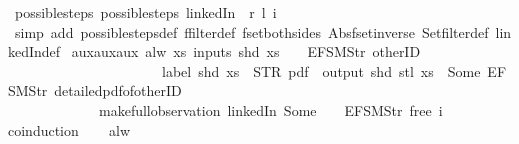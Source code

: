 \begin{isabellebody}
%
\endisadelimproof
\isanewline
{}\isamarkupfalse%
\ possible{\isacharunderscore}steps{\isacharunderscore}{}{\isacharcolon}\ {\isachardoublequoteopen}possible{\isacharunderscore}steps\ linkedIn\ {}\ r\ l\ i\ {\isacharequal}\ {\isacharbraceleft}{\isacharbar}{\isacharbar}{\isacharbraceright}{\isachardoublequoteclose}\isanewline
%
\isadelimproof
\ \ %
\endisadelimproof
%
\isatagproof
{}\isamarkupfalse%
\ {\isacharparenleft}simp\ add{\isacharcolon}\ possible{\isacharunderscore}steps{\isacharunderscore}def\ ffilter{\isacharunderscore}def\ fset{\isacharunderscore}both{\isacharunderscore}sides\ Abs{\isacharunderscore}fset{\isacharunderscore}inverse\ Set{\isachardot}filter{\isacharunderscore}def\ linkedIn{\isacharunderscore}def{\isacharparenright}%
\endisatagproof
{\isafoldproof}%
%
\isadelimproof
\isanewline
%
\endisadelimproof
\isanewline
{}\isamarkupfalse%
\ aux{}{\isacharunderscore}aux{}{\isacharunderscore}aux{}{\isacharcolon}\ {\isachardoublequoteopen}alw\ {\isacharparenleft}{\isasymlambda}xs{\isachardot}\ inputs\ {\isacharparenleft}shd\ xs{\isacharparenright}\ {\isacharbang}\ {}\ {\isacharequal}\ EFSM{\isachardot}Str\ {\isacharprime}{\isacharprime}otherID{\isacharprime}{\isacharprime}\ {\isasymlongrightarrow}\isanewline
\ \ \ \ \ \ \ \ \ \ \ \ \ \ \ \ \ \ \ \ \ \ label\ {\isacharparenleft}shd\ xs{\isacharparenright}\ {\isacharequal}\ STR\ {\isacharprime}{\isacharprime}pdf{\isacharprime}{\isacharprime}\ {\isasymlongrightarrow}\ output\ {\isacharparenleft}shd\ {\isacharparenleft}stl\ xs{\isacharparenright}{\isacharparenright}\ {\isasymnoteq}\ {\isacharbrackleft}Some\ {\isacharparenleft}EFSM{\isachardot}Str\ {\isacharprime}{\isacharprime}detailed{\isacharunderscore}pdf{\isacharunderscore}of{\isacharunderscore}otherID{\isacharprime}{\isacharprime}{\isacharparenright}{\isacharbrackright}{\isacharparenright}\isanewline
\ \ \ \ \ \ \ \ \ \ \ \ \ {\isacharparenleft}make{\isacharunderscore}full{\isacharunderscore}observation\ linkedIn\ {\isacharparenleft}Some\ {}{\isacharparenright}\ {\isacharless}{}\ {\isacharcolon}{\isacharequal}\ EFSM{\isachardot}Str\ {\isacharprime}{\isacharprime}free{\isacharprime}{\isacharprime}{\isachargreater}\ i{\isacharparenright}{\isachardoublequoteclose}\isanewline
%
\isadelimproof
%
\endisadelimproof
%
\isatagproof
{}\isamarkupfalse%
{\isacharparenleft}coinduction{\isacharparenright}\isanewline
\ \ \isamarkupfalse%
\ alw\isanewline
\ \ \isamarkupfalse%

\end{isabellebody}
